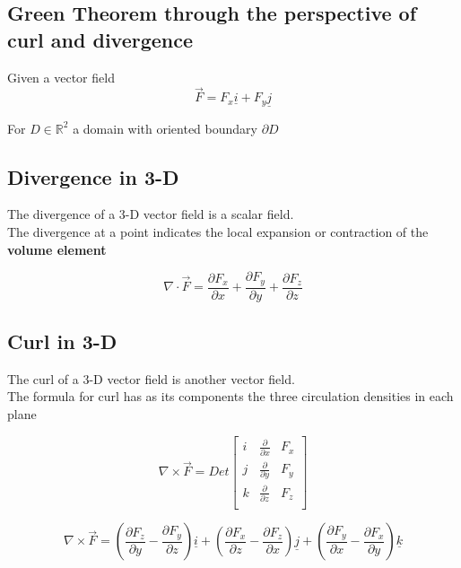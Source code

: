 \subsection{Green Theorem through the perspective of curl and divergence}

Given a vector field
\[
  \vec{F} = F_x \underline{i} + F_y \underline{j}
\] 

For $D \in \mathbb{R}^2$ a domain with oriented boundary $ \partial D$


\subsection{Divergence in 3-D}
\begin{framed}
   The divergence of a 3-D vector field is a scalar field. \\

   The divergence at a point indicates the local expansion or contraction of the \textbf{volume element}

   \[
     \nabla \cdot \vec{F} = \frac{\partial F_x}{\partial x} + \frac{\partial F_y}{\partial y} + \frac{\partial F_z}{\partial z}
   \] 
\end{framed}

\subsection{Curl in 3-D}
\begin{framed}
   The curl of a 3-D vector field is another vector field. \\

   The formula for curl has as its components the three circulation densities in each plane

   \[
     \nabla \times \vec{F} = Det \begin{bmatrix} 
        i & \frac{\partial }{\partial x} & F_x   \\
        j & \frac{\partial }{\partial y} & F_y   \\
        k & \frac{\partial }{\partial z} & F_z   \\
     \end{bmatrix}
   \] 

   \[
     \nabla \times \vec{F} = 
     \left( \frac{\partial F_z}{\partial y} - \frac{\partial F_y}{\partial z}  \right)  \underline{i} + 
     \left( \frac{\partial F_x}{\partial z} - \frac{\partial F_z}{\partial x}  \right)  \underline{j} + 
     \left( \frac{\partial F_y}{\partial x} - \frac{\partial F_x}{\partial y}  \right)  \underline{k} 
   \] 
  
\end{framed}


